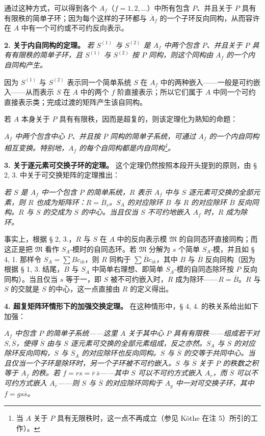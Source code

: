 \documentclass[11pt]{article}
\providecommand{\frM}{\mathfrak M}
\begin{document}
通过这种方式，可以得到各个 \(A_f\)（\(f=1,2,\ldots\)）中所有包含 \(P\)、并且关于 \(P\) 具有有限秩的简单子环；因为每个这样的子环都与 \(\overline A_f\) 的一个子环反向同构，从而容许在 \(A\) 中有一个可约或不可约反向表示。

\noindent\textbf{2. 关于内自同构的定理。} \emph{若 \(S^{(1)}\) 与 \(S^{(2)}\) 是 \(A_f\) 中两个包含 \(P\)、并且关于 \(P\) 具有有限秩的简单子环，且 \(S^{(1)}\) 与 \(S^{(2)}\) 按 \(P\) 同构，则这个同构由 \(A_f\) 的一个内自同构产生。}

因为 \(S^{(1)}\) 与 \(S^{(2)}\) 表示同一个简单系统 \(S\) 在 \(A_f\) 中的两种嵌入——一般是可约嵌入——从而表示 \(S\) 在 \(A\) 中的两个 \(f\) 阶直接表示；所以它们属于 \(A\) 中同一个可约直接表示类；完成过渡的矩阵产生该自同构。

若 \(A\) 本身关于 \(P\) 具有有限秩，因而是超复的，则该定理化为熟知的命题：

\emph{\(A_f\) 中两个包含中心 \(P\)、并且按 \(P\) 同构的简单子系统，可通过 \(A_f\) 的一个内自同构相互变换。特别地，\(A_f\) 的每个自同构都是内自同构\footnote{\normalfont 当 \(A\) 关于 \(P\) 具有无限秩时，这一点不再成立（参见 Köthe 在注 5）所引的工作）。}。}

\noindent\textbf{3. 关于逐元素可交换子环的定理。}
这个定理仍然按照本段开头提到的原则，由 § 2, 3. 中关于可交换矩阵的定理推出：

\emph{若 \(S\) 是 \(A_f\) 中一个包含 \(P\) 的简单系统，\(R\) 表示 \(A_f\) 中与 \(S\) 逐元素可交换的全部元素，则 \(R\) 也成为矩阵环：\(R=\overline B_s\)。\(S_A\) 的对应除环 \(B\) 与 \(R\) 的对应除环 \(\overline B\) 反向同构。\(R\) 与 \(S\) 的交成为 \(S\) 的中心。当且仅当 \(S\) 不可约地嵌入 \(A_f\) 时，\(R\) 成为除环。}

事实上，根据 § 2, 3.，\(R\) 与 \(S\) 在 \(A\) 中的反向表示模 \(\frM\) 的自同态环直接同构；而这正是把 \(\frM\) 看作 \(S_A\)-模时的自同态环。若 \(\frM\) 分解为 \(s\) 个简单 \(S_A\)-模，并且如 § 4, 1. 那样令 \(S_A=\sum Bc_{ik}\)，则 \(R\) 同构于 \(\sum \overline Bc_{ik}\)，其中 \(B\) 与 \(\overline B\) 反向同构（因为根据 § 1, 3. 结尾，\(B\) 与 \(S_A\) 中简单右理想、即简单 \(S_A\)-模的自同态除环按 \(P\) 反向同构）。当且仅当 \(s\) 等于一，即 \(S\) 被不可约嵌入时，\(R\) 成为除环——\(R=\overline B\)。\(R\) 与 \(S\) 的交就是 \(S\) 的中心，这一点直接由 \(R\) 的定义得出。

\noindent\textbf{4. 超复矩阵环情形下的加强交换定理。} 在这种情形中，§ 4, 4. 的秩关系给出如下加强：

\emph{\(A_f\) 中包含 \(P\) 的简单子系统——这里 \(A\) 关于其中心 \(P\) 具有有限秩——组成若干对 \(S,\overline S\)，使得 \(\overline S\) 由与 \(S\) 逐元素可交换的全部元素组成，反之亦然。\(S_A\) 与 \(\overline S\) 的对应除环反向同构，\(S\) 与 \(\overline S_A\) 的对应除环也反向同构。\(S\) 与 \(\overline S\) 的交等于共同中心。当且仅当一个子环是除环时，另一个子环被不可约嵌入。\(S\) 与 \(\overline S\) 关于 \(P\) 的秩数之积等于 \(A_f\) 的秩。若 \(f=rs=\overline r\,\overline s\)——其中 \(S\) 可以不可约方式嵌入 \(A_r\)，而 \(\overline S\) 可以不可约方式嵌入 \(A_{\overline r}\)——则 \(S\) 与 \(\overline S\) 的对应除环同构于 \(A_g\) 中一对可交换子环，其中 \(f=g s\overline s\)。}
\end{document}
